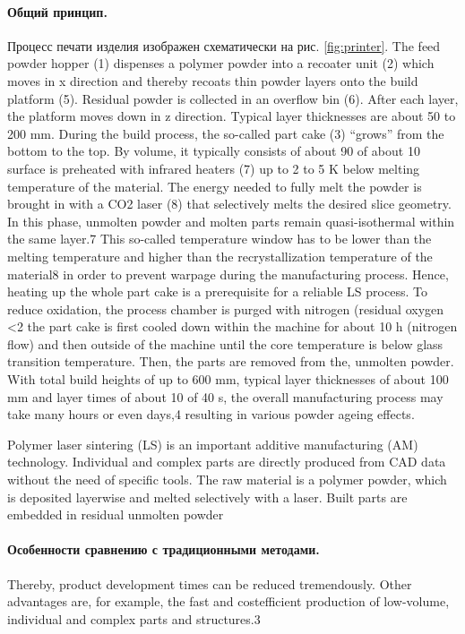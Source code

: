 \paragraph{Общий принцип. }Процесс печати изделия изображен схематически на рис. \ref{fig:printer}.
The
feed powder hopper (1) dispenses a polymer powder into a
recoater unit (2) which moves in x direction and thereby
recoats thin powder layers onto the build platform (5). Residual
powder is collected in an overflow bin (6). After each layer, the
platform moves down in z direction. Typical layer thicknesses
are about 50 to 200 mm. During the build process, the so-called
part cake (3) “grows” from the bottom to the top. By volume,
it typically consists of about 90%
of about 10%
surface is preheated with infrared heaters (7) up to 2 to 5 K
below melting temperature of the material. The energy needed
to fully melt the powder is brought in with a CO2 laser (8) that
selectively melts the desired slice geometry. In this phase,
unmolten powder and molten parts remain quasi-isothermal
within the same layer.7 This so-called temperature window has
to be lower than the melting temperature and higher than the
recrystallization temperature of the material8 in order to prevent
warpage during the manufacturing process. Hence, heating up
the whole part cake is a prerequisite for a reliable LS process.
To reduce oxidation, the process chamber is purged with nitrogen
(residual oxygen <2%
the part cake is first cooled down within the machine for about
10 h (nitrogen flow) and then outside of the machine until the
core temperature is below glass transition temperature. Then,
the parts are removed from the, unmolten powder. With total
build heights of up to 600 mm, typical layer thicknesses of
about 100 mm and layer times of about 10 of 40 s, the overall
manufacturing process may take many hours or even days,4
resulting in various powder ageing effects.




Polymer laser sintering (LS) is an important additive manufacturing (AM) technology. Individual and complex parts are
directly produced from CAD data without the need of specific tools. The raw material is a polymer powder, which is deposited layerwise
and melted selectively with a laser. Built parts are embedded in residual unmolten powder





\paragraph{Особенности сравнению с традиционными методами.}
Thereby, product development times can be reduced tremendously.
Other advantages are, for example, the fast and costefficient
production of low-volume, individual and complex parts
and structures.3
